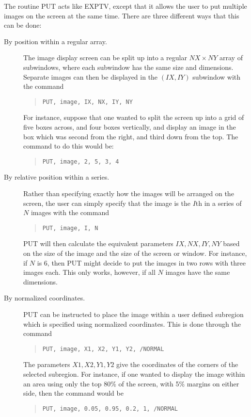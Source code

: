 The routine PUT acts like EXPTV, except that it allows the user to put multiple
images on the screen at the same time.  There are three different ways that
this can be done:
\begin{description}
\item[By position within a regular array.]
The image display screen can be split up into a regular \mbox{$NX \times NY$}
array of subwindows, where each subwindow has the same size and dimensions.
Separate images can then be displayed in the $(IX,IY)$ subwindow with the command
\begin{quote}
\begin{verbatim}
PUT, image, IX, NX, IY, NY
\end{verbatim}
\end{quote}
For instance, suppose that one wanted to split the screen up into a grid of
five boxes across, and four boxes vertically, and display an image in the
box which was second from the right, and third down from the top.  The command
to do this would be:
\begin{quote}
\begin{verbatim}
PUT, image, 2, 5, 3, 4
\end{verbatim}
\end{quote}

\item[By relative position within a series.]
Rather than specifying exactly how the images will be arranged on the screen,
the user can simply specify that the image is the $I$th in a series of $N$
images with the command
\begin{quote}
\begin{verbatim}
PUT, image, I, N
\end{verbatim}
\end{quote}
PUT will then calculate the equivalent parameters $IX,NX,IY,NY$ based on the
size of the image and the size of the screen or window.  For instance, if $N$
is 6, then PUT might decide to put the images in two rows with three images
each.  This only works, however, if all $N$ images have the same dimensions.

\item[By normalized coordinates.]
PUT can be instructed to place the image within a user defined subregion which
is specified using normalized coordinates.  This is done through the command
\begin{quote}
\begin{verbatim}
PUT, image, X1, X2, Y1, Y2, /NORMAL
\end{verbatim}
\end{quote}
The parameters $X1,X2,Y1,Y2$ give the coordinates of the corners of the
selected subregion.  For instance, if one wanted to display the image within an
area using only the top 80\% of the screen, with 5\% margins on either side,
then the command would be
\begin{quote}
\begin{verbatim}
PUT, image, 0.05, 0.95, 0.2, 1, /NORMAL
\end{verbatim}
\end{quote}
\end{description}

